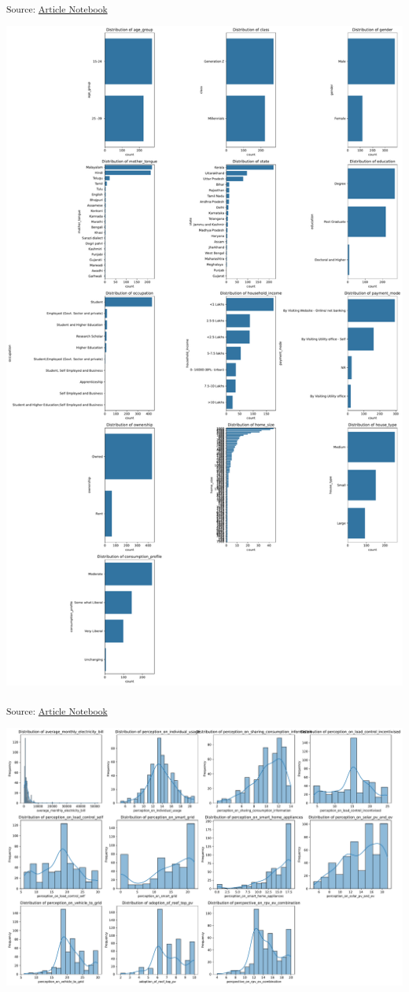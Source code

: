 \documentclass[
  letterpaper,
  DIV=11,
  numbers=noendperiod]{scrartcl}
\begin{document}
\textsubscript{Source:
\href{https://sijuswamyresearch.github.io/SM-project/index-preview.html}{Article
Notebook}}

\includegraphics{index_files/figure-pdf/cell-3-output-1.pdf}

\textsubscript{Source:
\href{https://sijuswamyresearch.github.io/SM-project/index-preview.html}{Article
Notebook}}

\includegraphics{index_files/figure-pdf/cell-4-output-1.pdf}
\end{document}
